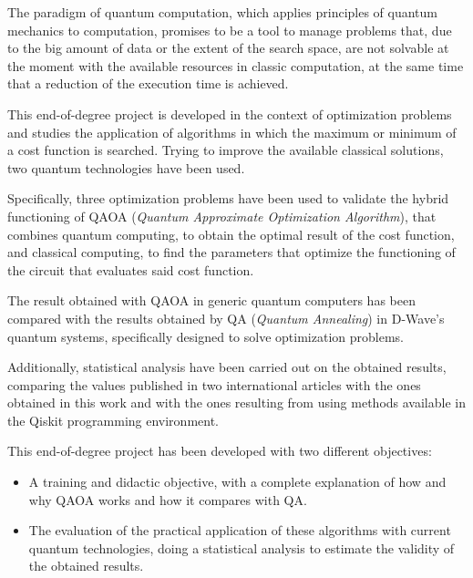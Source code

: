 The paradigm of quantum computation, which applies principles of quantum mechanics to computation, promises to be a tool to manage problems that, due to the big amount of data or the extent of the search space, are not solvable at the moment with the available resources in classic computation, at the same time that a reduction of the execution time is achieved.

This end-of-degree project is developed in the context of optimization problems and studies the application of algorithms in which the maximum or minimum of a cost function is searched.
Trying to improve the available classical solutions, two quantum technologies have been used.

Specifically, three optimization problems have been used to validate the hybrid functioning of QAOA (\textit{Quantum Approximate Optimization Algorithm}), that combines quantum computing, to obtain the optimal result of the cost function, and classical computing, to find the parameters that optimize the functioning of the circuit that evaluates said cost function.

The result obtained with QAOA in generic quantum computers has been compared with the results obtained by QA (\textit{Quantum Annealing}) in D-Wave's quantum systems, specifically designed to solve optimization problems.

Additionally, statistical analysis have been carried out on the obtained results, comparing the values published in two international articles with the ones obtained in this work and with the ones resulting from using methods available in the Qiskit programming environment.

This end-of-degree project has been developed with two different objectives:

\begin{itemize}
\item A training and didactic objective, with a complete explanation of how and why QAOA works and how it compares with QA\@.

\item The evaluation of the practical application of these algorithms with current quantum technologies, doing a statistical analysis to estimate the validity of the obtained results.
\end{itemize}


